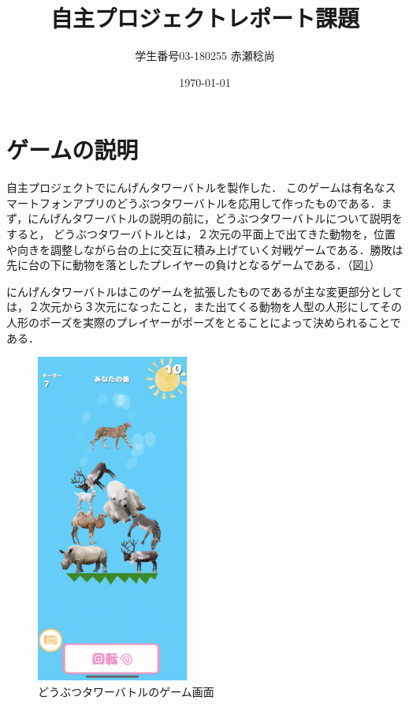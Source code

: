 \documentclass[uplatex,titlepage]{jsarticle}
\title{自主プロジェクトレポート課題}
\author{学生番号03-180255 赤瀬稔尚}
\date{\today}
\begin{document}
\maketitle

\section{ゲームの説明}
自主プロジェクトでにんげんタワーバトルを製作した．
このゲームは有名なスマートフォンアプリのどうぶつタワーバトルを応用して作ったものである．まず，にんげんタワーバトルの説明の前に，どうぶつタワーバトルについて説明をすると，
どうぶつタワーバトルとは，２次元の平面上で出てきた動物を，位置や向きを調整しながら台の上に交互に積み上げていく対戦ゲームである．勝敗は先に台の下に動物を落としたプレイヤーの負けとなるゲームである．（図\ref{doubutu}）

にんげんタワーバトルはこのゲームを拡張したものであるが主な変更部分としては，２次元から３次元になったこと，また出てくる動物を人型の人形にしてその人形のポーズを実際のプレイヤーがポーズをとることによって決められることである．

\begin{figure}
\begin{center}
   \includegraphics[width=5.0cm]{images/doubutu.PNG}
 \caption{どうぶつタワーバトルのゲーム画面}
 \label{doubutu}
 \end{center}
\end{figure}
\end{document}
